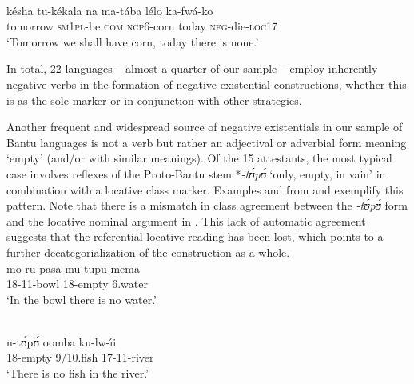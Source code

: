 \documentclass[output=paper,draft,draftmode,colorlinks,citecolor=brown]{langscibook}
\begin{document}
\ea\label{ex:kaonde-corn} \\
\gll k{é}sha tu-k{é}kala na ma-tába
l{é}lo ka-fwá-ko\\ tomorrow \textsc{sm1pl}-be \textsc{com}
\textsc{ncp}6-corn today \textsc{neg}-die-\textsc{loc}17\\
\glt `Tomorrow
we shall have corn, today there is none.'
\z


%
In total, 22 languages --
almost a quarter of our sample -- employ inherently negative verbs in
the formation of negative existential constructions, whether this is as the sole marker or in conjunction with other strategies.

Another frequent and widespread source of negative existentials in our
sample of Bantu languages is not a verb but rather an adjectival or
adverbial form meaning `empty' (and\slash or with similar meanings). Of the
15 attestants, the most typical case involves reflexes of the Proto-Bantu
stem *\textit{-t{\'ʊ}p{\'ʊ}} `only, empty, in vain'
\parencite{BastinCoupez2002,Angenot1977} in combination with a locative
class marker. Examples  and 
from  and  exemplify this pattern. Note that
there is a mismatch in class agreement between the \textit{-t{\'ʊ}p{\'ʊ}}
form and the locative nominal argument in . This
lack of automatic agreement suggests that the referential locative reading
has been lost, which points to a further decategorialization of the
construction as a whole.  \ea\label{ex:kwangali-water}
\\ 
\gll mo-ru-pasa m{\op}u{\cp}-tupu mema\\ 
18-11-bowl 18-empty 6.water\\
\glt `In the bowl there is
no water.'
\z

\ea\label{ex:ndengeleko-fish} \\
\gll n-t{\'ʊ}p{\'ʊ} oomba ku-lw-{\'\i}i\\
18-empty 9/10.fish 17-11-river\\
\glt `There is no fish in the river.'
\z
\end{document}
